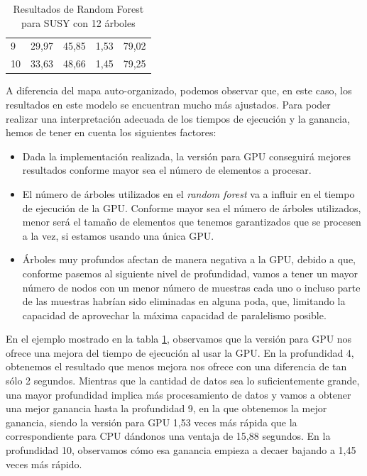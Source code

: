 \begin{table}[ht]
\begin{tabular}{@{}l|ll|c|c|@{}}
\multicolumn{1}{|l|}{9}                             & 29,97                                      & 45,85                 & 1,53                                              & 79,02                                 \\
\multicolumn{1}{|l|}{10}                            & 33,63                                      & 48,66                 & 1,45                                              & 79,25                                 \\ \bottomrule
\end{tabular}
\caption{Resultados de Random Forest para SUSY con 12 árboles}
\label{tab:rf}
\end{table}

A diferencia del mapa auto-organizado, podemos observar que, en este caso, los resultados en este modelo se encuentran mucho más ajustados. Para poder realizar una interpretación adecuada de los tiempos de ejecución y la ganancia, hemos de tener en cuenta los siguientes factores:

\begin{itemize}
	\item Dada la implementación realizada, la versión para GPU conseguirá mejores resultados conforme mayor sea el número de elementos a procesar.
	\item El número de árboles utilizados en el \textit{random forest} va a influir en el tiempo de ejecución de la GPU. Conforme mayor sea el número de árboles utilizados, menor será el tamaño de elementos que tenemos garantizados que se procesen a la vez, si estamos usando una única GPU.
	\item Árboles muy profundos afectan de manera negativa a la GPU, debido a que, conforme pasemos al siguiente nivel de profundidad, vamos a tener un mayor número de nodos con un menor número de muestras cada uno o incluso parte de las muestras habrían sido eliminadas en alguna poda, que, limitando la capacidad de aprovechar la máxima capacidad de paralelismo posible.
\end{itemize}

En el ejemplo mostrado en la tabla \ref{tab:rf}, observamos que la versión para GPU nos ofrece una mejora del tiempo de ejecución al usar la GPU. En la profundidad 4, obtenemos el resultado que menos mejora nos ofrece con una diferencia de tan sólo 2 segundos. Mientras que la cantidad de datos sea lo suficientemente grande, una mayor profundidad implica más procesamiento de datos y vamos a obtener una mejor ganancia hasta la profundidad 9, en la que obtenemos la mejor ganancia, siendo la versión para GPU 1,53 veces más rápida que la correspondiente para CPU dándonos una ventaja de 15,88 segundos. En la profundidad 10, observamos cómo esa ganancia empieza a decaer bajando a 1,45 veces más rápido. \\

